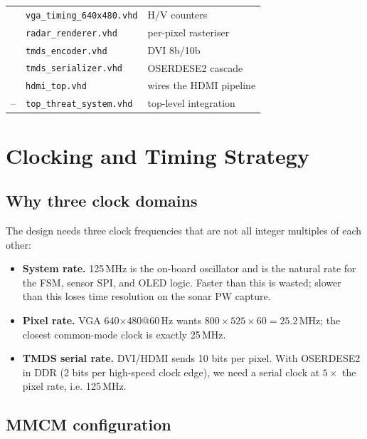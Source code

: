 \documentclass[11pt,a4paper]{article}
\begin{document}
\begin{table}[h]
\begin{tabular}{@{}lll@{}}
                      & \texttt{vga\_timing\_640x480.vhd} & H/V counters \\
                      & \texttt{radar\_renderer.vhd}    & per-pixel rasteriser \\
                      & \texttt{tmds\_encoder.vhd}      & DVI 8b/10b \\
                      & \texttt{tmds\_serializer.vhd}   & OSERDESE2 cascade \\
                      & \texttt{hdmi\_top.vhd}          & wires the HDMI pipeline \\
    --                & \texttt{top\_threat\_system.vhd} & top-level integration \\
    \bottomrule
  \end{tabular}
\end{table}

\section{Clocking and Timing Strategy}\label{sec:clk}

\subsection{Why three clock domains}

The design needs three clock frequencies that are not all integer
multiples of each other:

\begin{itemize}
  \item \textbf{System rate.} 125\,MHz is the on-board oscillator and
        is the natural rate for the FSM, sensor SPI, and OLED logic.
        Faster than this is wasted; slower than this loses time
        resolution on the sonar PW capture.
  \item \textbf{Pixel rate.} VGA 640$\times$480@60\,Hz wants
        $800 \times 525 \times 60 = 25.2$\,MHz; the closest
        common-mode clock is exactly 25\,MHz.
  \item \textbf{TMDS serial rate.} DVI/HDMI sends 10 bits per pixel.
        With OSERDESE2 in DDR (2 bits per high-speed clock edge), we
        need a serial clock at $5\times$ the pixel rate, i.e.
        125\,MHz.
\end{itemize}

\subsection{MMCM configuration}
\end{document}
